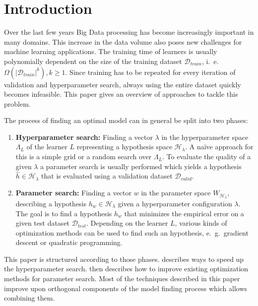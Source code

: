 \chapter{Introduction}%
\label{sec:intro}

\setcounter{page}{1}			%

Over the last few years Big Data processing has become increasingly important in many domains.
This increase in the data volume also poses new challenges for machine learning applications.
The training time of learners is usually polynomially dependent on the size of the training dataset \(\mathcal{D}_{\mathit{train}}\), i.~e. \(\Omega(|\mathcal{D}_{\mathit{train}}|^k), k \geq 1\).
Since training has to be repeated for every iteration of validation and hyperparameter search, always using the entire dataset quickly becomes infeasible.
This paper gives an overview of approaches to tackle this problem.

The process of finding an optimal model can in general be split into two phases:
\begin{enumerate}
	\item \textbf{Hyperparameter search:}
		Finding a vector \(\lambda\) in the hyperparameter space \(\Lambda_L\) of the learner \(L\) representing a hypothesis space \(\mathcal{H}_\lambda\).
		A na\"ive approach for this is a simple grid or a random search over \(\Lambda_L\).
		To evaluate the quality of a given \(\lambda\) a parameter search is usually performed which yields a hypothesis \(\hat{h} \in \mathcal{H}_\lambda\) that is evaluated using a validation dataset \(\mathcal{D}_{valid}\).
	\item \textbf{Parameter search:}
		Finding a vector \(w\) in the parameter space \(W_{\mathcal{H}_\lambda}\), describing a hypothesis \(h_w \in \mathcal{H}_\lambda\) given a hyperparameter configuration \(\lambda\).
		The goal is to find a hypothesis \(h_w\) that minimizes the empirical error on a given test dataset \(\mathcal{D}_{\mathit{test}}\).
		Depending on the learner \(L\), various kinds of optimization methods can be used to find such an hypothesis, e.~g.\ gradient descent or quadratic programming.
\end{enumerate}
This paper is structured according to those phases.
 describes ways to speed up the hyperparameter search.
 then describes how to improve existing optimization methods for parameter search.
Most of the techniques described in this paper improve upon orthogonal components of the model finding process which allows combining them.
